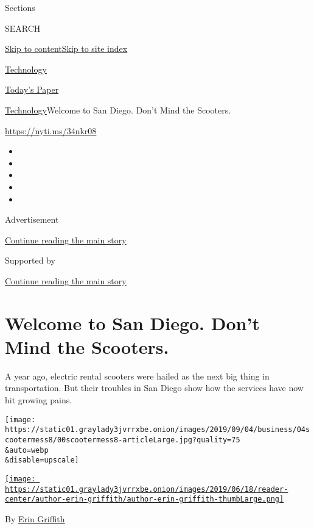 Sections

SEARCH

\protect\hyperlink{site-content}{Skip to
content}\protect\hyperlink{site-index}{Skip to site index}

\href{https://www.nytimes3xbfgragh.onion/section/technology}{Technology}

\href{https://myaccount.nytimes3xbfgragh.onion/auth/login?response_type=cookie\&client_id=vi}{}

\href{https://www.nytimes3xbfgragh.onion/section/todayspaper}{Today's
Paper}

\href{/section/technology}{Technology}\textbar{}Welcome to San Diego.
Don't Mind the Scooters.

\url{https://nyti.ms/34nkr08}

\begin{itemize}
\item
\item
\item
\item
\item
\end{itemize}

Advertisement

\protect\hyperlink{after-top}{Continue reading the main story}

Supported by

\protect\hyperlink{after-sponsor}{Continue reading the main story}

\hypertarget{welcome-to-san-diego-dont-mind-the-scooters}{%
\section{Welcome to San Diego. Don't Mind the
Scooters.}\label{welcome-to-san-diego-dont-mind-the-scooters}}

A year ago, electric rental scooters were hailed as the next big thing
in transportation. But their troubles in San Diego show how the services
have now hit growing pains.

\texttt{[image: https://static01.graylady3jvrrxbe.onion/images/2019/09/04/business/04scootermess8/00scootermess8-articleLarge.jpg?quality=75\\\&auto=webp\\\&disable=upscale]}

\href{https://www.nytimes3xbfgragh.onion/by/erin-griffith}{\texttt{[image: https://static01.graylady3jvrrxbe.onion/images/2019/06/18/reader-center/author-erin-griffith/author-erin-griffith-thumbLarge.png]}}

By \href{https://www.nytimes3xbfgragh.onion/by/erin-griffith}{Erin
Griffith}

